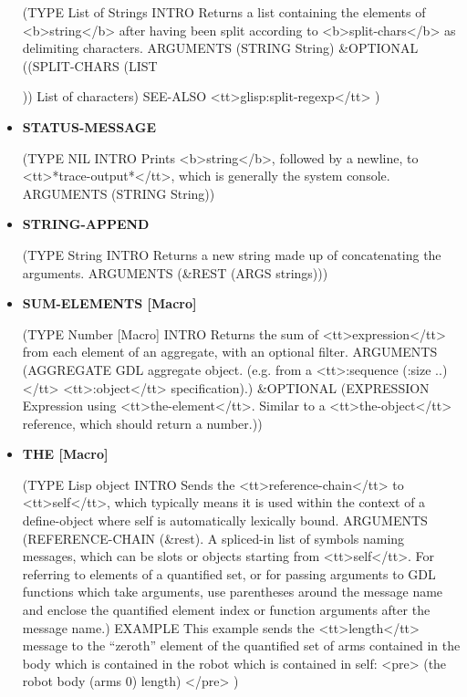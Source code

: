 \documentclass [11pt]{book}
\begin{document}
\begin{itemize}
(TYPE List of Strings INTRO  Returns a list containing the elements of <b>string</b> after having
been split according to <b>split-chars</b> as delimiting characters.
 ARGUMENTS (STRING String) \&OPTIONAL ((SPLIT-CHARS (LIST   
 
 	)) List of characters) SEE-ALSO <tt>glisp:split-regexp</tt> 
)



\item {}
\label{prim:status-message}
\textbf{STATUS-MESSAGE}

(TYPE NIL INTRO  Prints <b>string</b>, followed by a newline, to <tt>*trace-output*</tt>,
which is generally the system console.
 ARGUMENTS (STRING String))



\item {}
\label{prim:string-append}
\textbf{STRING-APPEND}

(TYPE String INTRO  Returns a new string made up of concatenating the arguments.
 ARGUMENTS (\&REST (ARGS strings)))



\item {}
\label{prim:sum-elements}
\textbf{SUM-ELEMENTS [Macro]}

(TYPE Number [Macro] INTRO  Returns the sum of <tt>expression</tt> from each element of an aggregate,
with an optional filter.
 ARGUMENTS (AGGREGATE GDL aggregate object. (e.g. from a <tt>:sequence (:size ..)</tt> <tt>:object</tt> specification).) \&OPTIONAL (EXPRESSION Expression using <tt>the-element</tt>. Similar to a <tt>the-object</tt> reference, which should return a number.))



\item {}
\label{prim:the}
\textbf{THE [Macro]}

(TYPE Lisp object INTRO  Sends the <tt>reference-chain</tt> to <tt>self</tt>, which typically means it is
used within the context of a define-object where self is automatically lexically bound.
 ARGUMENTS (REFERENCE-CHAIN (\&rest). A spliced-in list of symbols naming messages, which can 
be slots or objects starting from <tt>self</tt>. For referring to elements of a quantified set,
or for passing arguments to GDL functions which take arguments, use parentheses around the
message name and enclose the quantified element index or function arguments after the message
name.) EXAMPLE 
This example sends the <tt>length</tt> message to the ``zeroth'' element of the quantified
set of arms contained in the body which is contained in the robot which is contained in self:
<pre>
 (the robot body (arms 0) length)
</pre>
)




\end{itemize}
\end{document}
